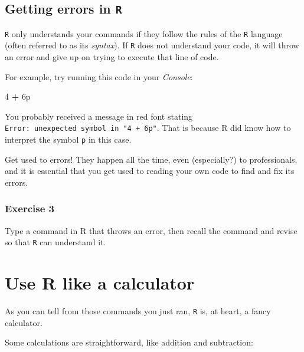 \documentclass[
]{book}
\newenvironment{Shaded}{\begin{snugshade}}{\end{snugshade}}
\newcommand{\DecValTok}[1]{\textcolor[rgb]{0.00,0.00,0.81}{#1}}
\newcommand{\NormalTok}[1]{#1}
\newcommand{\OperatorTok}[1]{\textcolor[rgb]{0.81,0.36,0.00}{\textbf{#1}}}
\newcommand{\StringTok}[1]{\textcolor[rgb]{0.31,0.60,0.02}{#1}}
\begin{document}
\hypertarget{getting-errors-in-r}{%
\subsection*{\texorpdfstring{Getting errors in \texttt{R}}{Getting errors in R}}\label{getting-errors-in-r}}

\texttt{R} only understands your commands if they follow the rules of the \texttt{R} language (often referred to as its \emph{syntax}). If \texttt{R} does not understand your code, it will throw an error and give up on trying to execute that line of code.

For example, try running this code in your \emph{Console}:

\begin{Shaded}
\begin{Highlighting}[]
\DecValTok{4} \OperatorTok{+}\StringTok{ }\NormalTok{6p}
\end{Highlighting}
\end{Shaded}

You probably received a message in red font stating \texttt{Error:\ unexpected\ symbol\ in\ "4\ +\ 6p"}. That is because R did know how to interpret the symbol \texttt{p} in this case.

Get used to errors! They happen all the time, even (especially?) to professionals, and it is essential that you get used to reading your own code to find and fix its errors.

\hypertarget{exercise-3}{%
\subsubsection*{Exercise 3}\label{exercise-3}}

Type a command in R that throws an error, then recall the command and revise so that \texttt{R} can understand it.

\hypertarget{use-r-like-a-calculator}{%
\section*{Use R like a calculator}\label{use-r-like-a-calculator}}

As you can tell from those commands you just ran, \texttt{R} is, at heart, a fancy calculator.

Some calculations are straightforward, like addition and subtraction:
\end{document}
